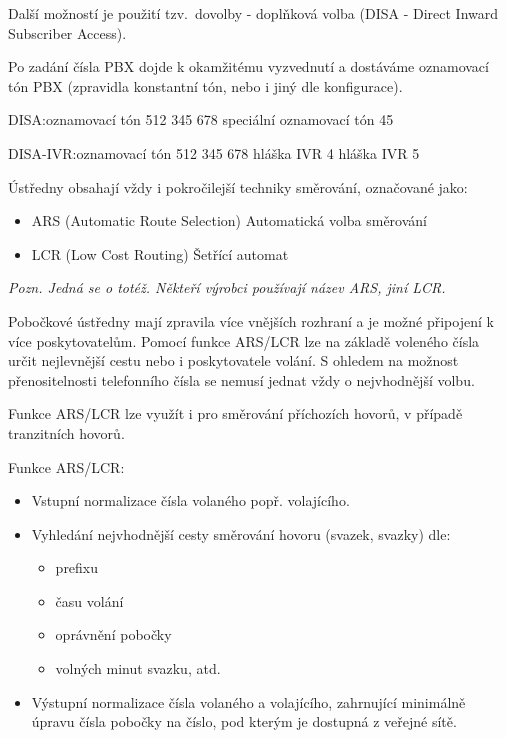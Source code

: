 Další možností je použití tzv.\ dovolby - doplňková volba (DISA - Direct Inward Subscriber Access).

Po zadání čísla PBX dojde k okamžitému vyzvednutí a dostáváme oznamovací tón PBX (zpravidla konstantní tón, nebo i jiný dle konfigurace).

DISA:\@ oznamovací tón 512 345 678 speciální oznamovací tón 45

DISA-IVR:\@ oznamovací tón 512 345 678 hláška IVR 4 hláška IVR 5


Ústředny obsahají vždy i pokročilejší techniky směrování, označované jako:
\begin{itemize}[noitemsep]
    \item ARS (Automatic Route Selection) Automatická volba směrování
    \item LCR (Low Cost Routing) Šetřící automat
\end{itemize}

\emph{Pozn. Jedná se o totéž. Někteří výrobci používají název ARS, jiní LCR.}

Pobočkové ústředny mají zpravila více vnějších rozhraní a je možné připojení k více poskytovatelům. Pomocí funkce ARS/LCR lze na základě voleného čísla určit nejlevnější cestu nebo i poskytovatele volání. S ohledem na možnost přenositelnosti telefonního čísla se nemusí jednat vždy o nejvhodnější volbu.

Funkce ARS/LCR lze využít i pro směrování příchozích hovorů, v případě tranzitních hovorů.

\noindent Funkce ARS/LCR:
\begin{itemize}[noitemsep]
    \item Vstupní normalizace čísla volaného popř. volajícího.
    \item Vyhledání nejvhodnější cesty směrování hovoru (svazek, svazky) dle:
    \begin{itemize}[noitemsep]
        \item prefixu
        \item času volání
        \item oprávnění pobočky
        \item volných minut svazku, atd.
    \end{itemize}
    \item Výstupní normalizace čísla volaného a volajícího, zahrnující minimálně úpravu čísla pobočky na číslo, pod kterým je dostupná z veřejné sítě.
\end{itemize}

